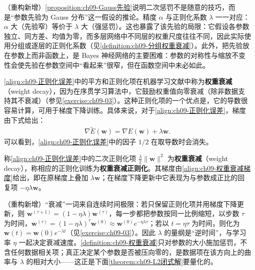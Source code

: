 \documentclass[../../main.tex]{subfiles}
\begin{document}
\begin{remark}（重构新增）\cref{proposition:ch09-Gauss先验}说明二次惩罚不是随意的技巧，而是“参数先验为 Gauss 分布”这一假设的推论。精度 $\alpha$ 与正则化系数 $\lambda$ 一一对应：$\alpha$ 大（先验窄）等价于 $\lambda$ 大（强惩罚）。这也暴露了该先验的局限：它假设各参数独立、同方差、均值为零，而多层网络中不同层的权重尺度往往不同，因此实际使用分组或逐层的正则化系数（见\cref{definition:ch09-分组权重衰减}）。此外，把先验放在参数上而非函数上，是 Bayes 神经网络的主要困难：参数的对称性与缩放不变性会使先验在参数空间中“看起来”很窄，但在函数空间中未必如此。
\end{remark}

\eqref{align:ch09-正则化误差}中的平方和正则化项在机器学习文献中称为\textbf{权重衰减}（weight decay），因为在序贯学习算法中，它鼓励权重值向零衰减（除非数据支持其不衰减）（参见\cref{exercise:ch09-03}）。这种正则化项的一个优点是，它的导数很容易计算，可用于梯度下降训练。具体来说，对于\eqref{align:ch09-正则化误差}，梯度由下式给出：
\begin{align}
\nabla\widetilde{E}(\boldsymbol{w})=\nabla E(\boldsymbol{w})+\lambda\boldsymbol{w}.
\label{align:ch09-权重衰减梯度}
\end{align}
可以看到，\eqref{align:ch09-正则化误差}中的因子 $1/2$ 在取导数时会消失。

\begin{definition}[权重衰减]\label{definition:ch09-权重衰减}
称\eqref{align:ch09-正则化误差}中的二次正则化项 $\frac{\lambda}{2}\|\boldsymbol{w}\|^{2}$ 为\textbf{权重衰减}（weight decay），称相应的正则化训练为\textbf{权重衰减正则化}。其梯度由\eqref{align:ch09-权重衰减梯度}给出，即在原梯度上叠加 $\lambda\boldsymbol{w}$；在梯度下降更新中它表现为与参数成正比的回复项 $-\eta\lambda\boldsymbol{w}$。
\end{definition}

\begin{remark}（重构新增）“衰减”一词来自连续时间极限：若只保留正则化项并用梯度下降更新，则 $\boldsymbol{w}^{(\tau+1)}=(1-\eta\lambda)\boldsymbol{w}^{(\tau)}$，每一步都把参数按同一比例缩短，以步数 $\tau$ 为时间，$\boldsymbol{w}^{(\tau)}=(1-\eta\lambda)^{\tau}\boldsymbol{w}^{(0)}\approx\boldsymbol{w}^{(0)}e^{-\eta\lambda\tau}$；若以 $t=\eta\tau$ 为时间，则化为 $\boldsymbol{w}(t)=\boldsymbol{w}(0)e^{-\lambda t}$（见\cref{exercise:ch09-03}）。因此 $\lambda$ 的量纲是“逆时间”，与学习率 $\eta$ 一起决定衰减速度。\cref{definition:ch09-权重衰减}只对参数的大小施加惩罚，不含任何数据相关项；真正决定某个参数是否被压向零的，是数据项在该方向上的曲率与 $\lambda$ 的相对大小——这正是下面\cref{theorem:ch09-L2闭式解}要量化的。
\end{remark}
\end{document}
